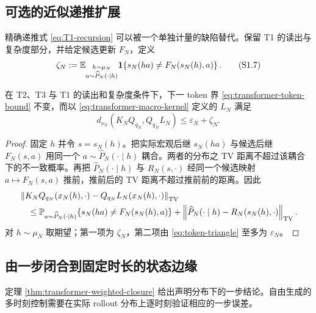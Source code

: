 \subsection{可选的近似递推扩展}

精确递推式 \eqref{eq:T1-recursion} 可以被一个单独计量的缺陷替代。保留 T1 的读出与复杂度部分，并给定候选更新 $F_N$，定义
\[
 \zeta_N
 :=\mathbb E_{\substack{h\sim\mu_N\\
                         a\sim\widehat P_N(\cdot\mid h)}}
 \one\!\left\{s_N(ha)\ne F_N(s_N(h),a)\right\}.
 \tag{\TransformerEquationPrefix.7}\label{eq:recursion-defect}
\]

\begin{proposition}[近似递推]
\label{prop:transformer-approx-recursion}
在 T2、T3 与 T1 的读出和复杂度条件下，下一 token 界
\eqref{eq:transformer-token-bound} 不变，而以
\eqref{eq:transformer-macro-kernel} 定义的 $L_N$ 满足
\[
 d_{\nu_N}(K_NQ_{q_N},Q_{q_N}L_N)
 \le\varepsilon_N+\zeta_N.
 \tag{\TransformerEquationPrefix.8}\label{eq:approx-recursion-bound}
\]
\end{proposition}

\begin{proof}
固定 $h$ 并令 $s=s_N(h)$。把实际宏观后继
$s_N(ha)$ 与候选后继 $F_N(s,a)$ 用同一个
$a\sim\widehat P_N(\cdot\mid h)$ 耦合。两者的分布之 TV 距离不超过该耦合下的不一致概率。再把
$\widehat P_N(\cdot\mid h)$ 与 $R_N(s,\cdot)$ 经同一个候选映射
$a\mapsto F_N(s,a)$ 推前，推前后的 TV 距离不超过推前前的距离。因此
\[
 \begin{aligned}
 &\left\|K_NQ_{q_N}(x_N(h),\cdot)
       -Q_{q_N}L_N(x_N(h),\cdot)\right\|_{\operatorname{TV}}\\
 &\quad\le
 \mathbb P_{a\sim\widehat P_N(\cdot\mid h)}
 \{s_N(ha)\ne F_N(s_N(h),a)\}
 +\left\|\widehat P_N(\cdot\mid h)-R_N(s_N(h),\cdot)\right\|_{\operatorname{TV}}.
 \end{aligned}
\]
对 $h\sim\mu_N$ 取期望；第一项为 $\zeta_N$，第二项由
\eqref{eq:token-triangle} 至多为 $\varepsilon_N$。
\end{proof}

\subsection{由一步闭合到固定时长的状态边缘}

定理 \ref{thm:transformer-weighted-closure} 给出声明分布下的一步结论。自由生成的多时刻控制需要在实际 rollout 分布上逐时刻验证相应的一步误差。

